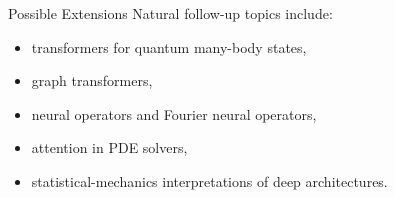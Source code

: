 \documentclass{beamer}
\begin{document}
\begin{frame}{Possible Extensions}
  Natural follow-up topics include:
  \begin{itemize}
  \item transformers for quantum many-body states,
  \item graph transformers,
  \item neural operators and Fourier neural operators,
  \item attention in PDE solvers,
  \item statistical-mechanics interpretations of deep architectures.
  \end{itemize}
\end{frame}
\end{document}

